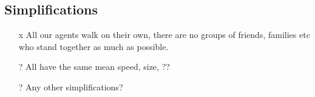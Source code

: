 
\subsection{Simplifications}
\begin{itemize}
\item[x] All our agents walk on their own, there are no groups of friends, families etc who stand together as much as possible.
\item[?] All have the same mean speed, size, ??
\item[?] Any other simplifications?
\end{itemize}
